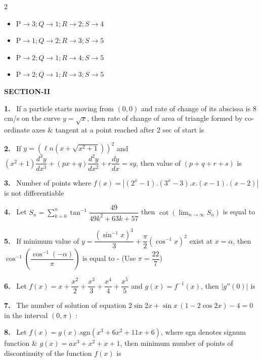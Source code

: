 \documentclass[10pt]{extarticle}
\newcommand{\sect}[1]{\par\smallskip\noindent\textbf{#1}\par}
\newcommand{\qn}[1]{\par\smallskip\noindent\textbf{#1.}~}
\newenvironment{qoptions}{\begin{itemize}[leftmargin=1.8em,itemsep=1pt,topsep=2pt,label={}]}{\end{itemize}}
\newcommand{\opt}[2]{\item[(#1)] #2}
\begin{document}
\begin{multicols}{2}
\begin{center}
\end{center}
\begin{qoptions}
\opt{A}{$\mathrm P\to3;Q\to1;R\to2;S\to4$}
\opt{B}{$\mathrm P\to1;Q\to2;R\to3;S\to5$}
\opt{C}{$\mathrm P\to2;Q\to1;R\to4;S\to5$}
\opt{D}{$\mathrm P\to2;Q\to1;R\to3;S\to5$}
\end{qoptions}
\sect{SECTION-II}
\qn{1} If a particle starts moving from $(0,0)$ and rate of change of its abscissa is 8 cm/s on the curve $y=\sqrt x$, then rate of change of area of triangle formed by co-ordinate axes \& tangent at a point reached after 2 sec of start is
\qn{2} If $y=\left(\ell n\left(x+\sqrt{x^2+1}\right)\right)^2$ and $(x^2+1)\dfrac{d^3y}{dx^3}+(px+q)\dfrac{d^2y}{dx^2}+r\dfrac{dy}{dx}=sy$, then value of $(p+q+r+s)$ is
\qn{3} Number of points where $f(x)=\left|(2^x-1).(3^x-3).x.(x-1).(x-2)\right|$ is not differentiable
\qn{4} Let $S_n=\displaystyle\sum_{k=0}^{n}\tan^{-1}\dfrac{49}{49k^2+63k+57}$ then $\cot\left(\displaystyle\lim_{n\to\infty}S_n\right)$ is equal to
\qn{5} If minimum value of $y=\dfrac{\left(\sin^{-1}x\right)^3}{3}+\dfrac\pi2\left(\cos^{-1}x\right)^2$ exist at $x=\alpha$, then $\cos^{-1}\left(\dfrac{\cos^{-1}(-\alpha)}{\pi}\right)$ is equal to - (Use $\pi=\dfrac{22}{7}$)
\qn{6} Let $f(x)=x+\dfrac{x^2}{2}+\dfrac{x^3}{3}+\dfrac{x^4}{4}+\dfrac{x^5}{5}$ and $g(x)=f^{-1}(x)$, then $|g''(0)|$ is
\qn{7} The number of solution of equation $2\sin2x+\sin x\,(1-2\cos2x)-4=0$ in the interval $(0,\pi)$ :
\qn{8} Let $f(x)=g(x).\mathrm{sgn}(x^3+6x^2+11x+6)$, where sgn denotes signum function \& $g(x)=ax^3+x^2+x+1$, then minimum number of points of discontinuity of the function $f(x)$ is
\end{multicols}
\end{document}
